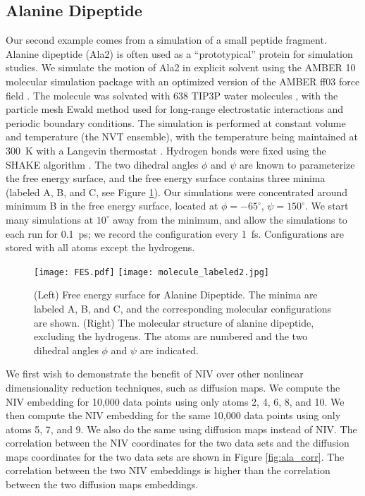\documentclass[twocolumn]{revtex4}
\begin{document}
\subsection{Alanine Dipeptide}

Our second example comes from a simulation of a small peptide fragment.
%
Alanine dipeptide (Ala2) is often used as a ``prototypical'' protein for simulation studies.
%
We simulate the motion of Ala2 in explicit solvent using the AMBER 10 molecular simulation package \cite{case2008Amber} with an
optimized version \cite{best2009optimized} of the AMBER ff03 force field \cite{duan2003point}.
%
The molecule was solvated with 638 TIP3P water molecules \cite{jorgensen1983comparison}, with the particle mesh Ewald method used for long-range electrostatic interactions \cite{essmann1995smooth} and periodic boundary conditions.
%
The simulation is performed at constant volume and temperature (the NVT ensemble), with the temperature being maintained at 300~K with a Langevin thermostat \cite{loncharich1992langevin}.
%
Hydrogen bonds were fixed using the SHAKE algorithm \cite{ryckaert1977numerical}.
%
The two dihedral angles $\phi$ and $\psi$ are known to parameterize the free energy surface, and the free energy surface contains three minima (labeled A, B, and C, see Figure \ref{fig:ala_fes}).
%
Our simulations were concentrated around minimum B in the free energy surface, located at $\phi=-65^{\circ}$, $\psi=150^{\circ}$.
%
We start many simulations at $10^{\circ}$ away from the minimum, and allow the simulations to each run for 0.1~ps; we record the configuration every 1~fs.
%
Configurations are stored with all atoms except the hydrogens.

\begin{figure}[ht]
    \texttt{[image: FES.pdf]}
    \texttt{[image: molecule\_labeled2.jpg]}
    \caption{(Left) Free energy surface for Alanine Dipeptide. The minima are labeled A, B, and C, and the corresponding molecular configurations are shown. (Right) The molecular structure of alanine dipeptide, excluding the hydrogens. The atoms are numbered and the two dihedral angles $\phi$ and $\psi$ are indicated.}
    \label{fig:ala_fes}
\end{figure}


We first wish to demonstrate the benefit of NIV over other nonlinear dimensionality reduction techniques, such as diffusion maps.
%
We compute the NIV embedding for 10,000 data points using only atoms 2, 4, 6, 8, and 10.
%
We then compute the NIV embedding for the same 10,000 data points using only atoms 5, 7, and 9.
%
We also do the same using diffusion maps instead of NIV.
%
The correlation between the NIV coordinates for the two data sets and the diffusion maps coordinates for the two data sets are shown in Figure \ref{fig:ala_corr}.
%
The correlation between the two NIV embeddings is higher than the correlation between the two diffusion maps embeddings.
\end{document}
